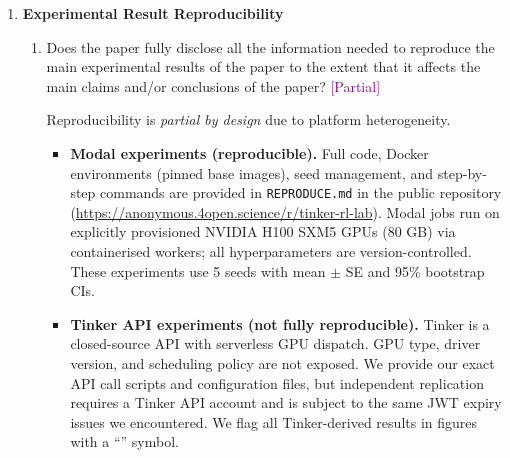 \documentclass{article}
\newcommand{\answerPartial}[1][]{\textcolor{purple}{[Partial] #1}}
\begin{document}
\begin{enumerate}
\item {\bf Experimental Result Reproducibility}
    \begin{enumerate}
        \item Does the paper fully disclose all the information needed to
              reproduce the main experimental results of the paper to the
              extent that it affects the main claims and/or conclusions of
              the paper?
        \answerPartial{Reproducibility is \emph{partial by design} due to
        platform heterogeneity.
        \begin{itemize}
          \item \textbf{Modal experiments (reproducible).}  Full code,
                Docker environments (pinned base images), seed management,
                and step-by-step commands are provided in
                \texttt{REPRODUCE.md} in the public repository
                (\url{https://anonymous.4open.science/r/tinker-rl-lab}).
                Modal jobs run on explicitly provisioned NVIDIA H100 SXM5
                GPUs (80 GB) via containerised workers; all hyperparameters
                are version-controlled.  These experiments use 5 seeds with
                mean $\pm$ SE and 95\% bootstrap CIs.
          \item \textbf{Tinker API experiments (not fully reproducible).}
                Tinker is a closed-source API with serverless GPU dispatch.
                GPU type, driver version, and scheduling policy are not
                exposed.  We provide our exact API call scripts and
                configuration files, but independent replication requires a
                Tinker API account and is subject to the same JWT expiry
                issues we encountered.  We flag all Tinker-derived results
                in figures with a ``\dag{}'' symbol.
        \end{itemize}}
    \end{enumerate}


\end{enumerate}
\end{document}
